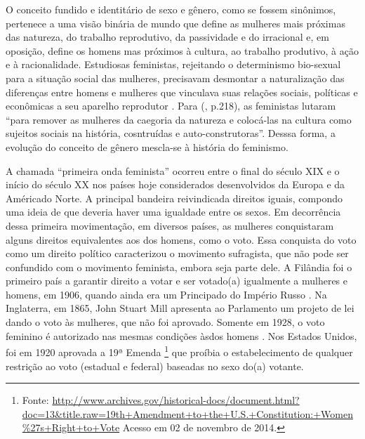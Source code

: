 O conceito fundido e identitário de sexo e gênero, como se fossem sinônimos, pertenece a uma visão binária de mundo que define as mulheres mais próximas das natureza, do trabalho reprodutivo, da passividade e do irracional e, em oposição, define os homens mas próximos à cultura, ao trabalho produtivo, à ação e à racionalidade\cite{HARAWAY2004}.
Estudiosas feministas, rejeitando o determinismo bio-sexual para a situação social das mulheres, precisavam desmontar a naturalização das diferenças entre homens e mulheres que vinculava suas relações sociais, políticas e econômicas a seu aparelho reprodutor \cite{PISCITELLI2009}. 
Para (\citeyear{HARAWAY2004}, p.218), as feministas lutaram ``para remover as mulheres da caegoria da natureza e colocá-las na cultura como sujeitos sociais na história, cosntruídas e auto-construtoras''. Desssa forma, a evolução do conceito de gênero mescla-se à história do feminismo.

A chamada ``primeira onda feminista'' ocorreu entre o final do século XIX e o início do século XX nos países hoje considerados desenvolvidos da Europa e da Américado Norte. A principal bandeira reivindicada direitos iguais, compondo uma ideia de que deveria haver uma igualdade entre os sexos. Em decorrência dessa primeira movimentação, em diversos países, as mulheres conquistaram alguns direitos equivalentes aos dos homens, como o voto. Essa conquista do voto como um direito político caracterizou o movimento sufragista, que não pode ser confundido com o movimento feminista, embora seja parte dele.
A Filândia foi o primeiro país a garantir direito a votar e ser votado(a) igualmente a mulheres e homens, em 1906, quando ainda era um Principado do Império Russo \cite{RAY1918}.
Na Inglaterra, em 1865, John Stuart Mill apresenta ao Parlamento um projeto de lei dando o voto às mulheres, que não foi aprovado. Somente em 1928, o voto feminino é autorizado nas mesmas condições àsdos homens \cite{NELSON2004}.
Nos Estados Unidos, foi em 1920 aprovada a 19ª Emenda
\footnote{Fonte: \url{http://www.archives.gov/historical-docs/document.html?doc=13&title.raw=19th+Amendment+to+the+U.S.+Constitution:+Women\%27s+Right+to+Vote} Acesso em 02 de novembro de 2014.} que proíbia o estabelecimento de qualquer restrição ao voto (estadual e federal) baseadas no sexo do(a) votante. 
 
